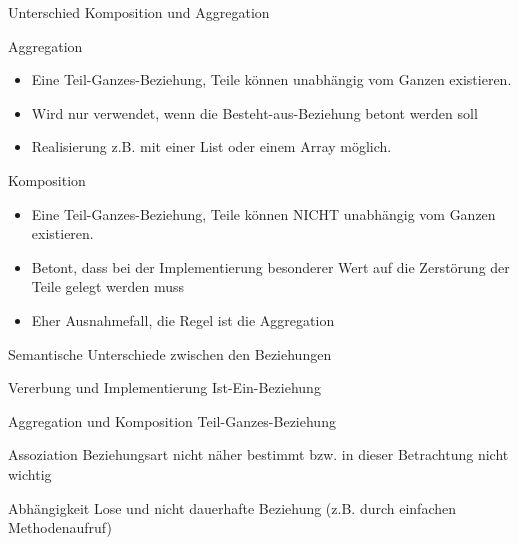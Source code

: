\begin{frame}{Unterschied Komposition und Aggregation}
	\begin{block}{Aggregation}
        \begin{itemize}
            \item Eine Teil-Ganzes-Beziehung, Teile können unabhängig vom Ganzen existieren.
            \item Wird nur verwendet, wenn die Besteht-aus-Beziehung betont werden soll
            \item Realisierung z.B. mit einer List oder einem Array möglich.
        \end{itemize}
	\end{block}

    \begin{block}{Komposition}
        \begin{itemize}
            \item Eine Teil-Ganzes-Beziehung, Teile können NICHT unabhängig vom Ganzen existieren.
            \item Betont, dass bei der Implementierung besonderer Wert auf die Zerstörung der Teile gelegt werden muss
            \item Eher Ausnahmefall, die Regel ist die Aggregation
        \end{itemize}
	\end{block}
\end{frame}

\begin{frame}{Semantische Unterschiede zwischen den Beziehungen}
	\begin{block}{Vererbung und Implementierung}
        Ist-Ein-Beziehung
	\end{block}
    \begin{block}{Aggregation und Komposition}
        Teil-Ganzes-Beziehung
	\end{block}

    \begin{block}{Assoziation}
        Beziehungsart nicht näher bestimmt bzw. in dieser Betrachtung nicht wichtig
	\end{block}

    \begin{block}{Abhängigkeit}
        Lose und nicht dauerhafte Beziehung (z.B. durch einfachen Methodenaufruf)
	\end{block} 
\end{frame}

